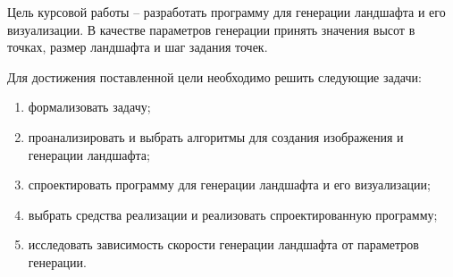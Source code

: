 
Цель курсовой работы -- разработать программу для генерации ландшафта и его визуализации. В качестве параметров генерации принять значения высот в точках, размер ландшафта и шаг задания точек. 

Для достижения поставленной цели необходимо решить следующие задачи:

\begin{enumerate}
	\item формализовать задачу;
	\item проанализировать и выбрать алгоритмы для создания изображения и генерации ландшафта;
	\item спроектировать программу для генерации ландшафта и его визуализации;
	\item выбрать средства реализации и реализовать спроектированную программу;
	\item исследовать зависимость скорости генерации ландшафта от параметров генерации.
\end{enumerate}